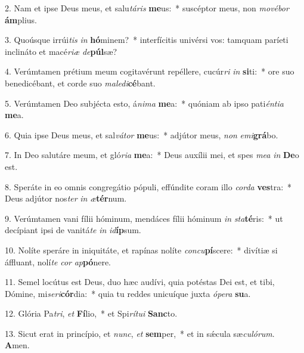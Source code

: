 2. Nam et ipse Deus meus, et salu\textit{tá}\textit{ris} \textbf{me}us:~*  suscéptor meus, non \textit{mo}\textit{vé}\textit{bor} \textbf{ám}plius.\

3. Quoúsque irrúi\textit{tis} \textit{in} \textbf{hó}minem?~*  interfícitis univérsi vos: tamquam paríeti inclináto et macé\textit{ri}\textit{æ} \textit{de}\textbf{púl}sæ?\

4. Verúmtamen prétium meum cogitavérunt repéllere, cucúr\textit{ri} \textit{in} \textbf{si}ti:~*  ore suo benedicébant, et corde suo \textit{ma}\textit{le}\textit{di}\textbf{cé}bant.\

5. Verúmtamen Deo subjécta esto, á\textit{ni}\textit{ma} \textbf{me}a:~*  quóniam ab ipso pati\textit{én}\textit{ti}\textit{a} \textbf{me}a.\

6. Quia ipse Deus meus, et sal\textit{vá}\textit{tor} \textbf{me}us:~*  adjútor meus, \textit{non} \textit{e}\textit{mi}\textbf{grá}bo.\

7. In Deo salutáre meum, et gló\textit{ri}\textit{a} \textbf{me}a:~*  Deus auxílii mei, et spes \textit{me}\textit{a} \textit{in} \textbf{De}o est.\

8. Speráte in eo omnis congregátio pópuli, effúndite coram illo \textit{cor}\textit{da} \textbf{ves}tra:~*  Deus adjútor nos\textit{ter} \textit{in} \textit{æ}\textbf{tér}num.\

9. Verúmtamen vani fílii hóminum, mendáces fílii hóminum \textit{in} \textit{sta}\textbf{té}ris:~*  ut decípiant ipsi de vanitá\textit{te} \textit{in} \textit{id}\textbf{íp}sum.\

10. Nolíte speráre in iniquitáte, et rapínas nolíte \textit{con}\textit{cu}\textbf{pí}scere:~*  divítiæ si áffluant, nolí\textit{te} \textit{cor} \textit{ap}\textbf{pó}nere.\

11. Semel locútus est Deus, duo hæc audívi, quia potéstas Dei est, et tibi, Dómine, mi\textit{se}\textit{ri}\textbf{cór}dia:~*  quia tu reddes unicuíque juxta \textit{ó}\textit{pe}\textit{ra} \textbf{su}a.\

12. Glória Pa\textit{tri}, \textit{et} \textbf{Fí}lio,~*  et Spi\textit{rí}\textit{tu}\textit{i} \textbf{Sanc}to.\

13. Sicut erat in princípio, et \textit{nunc}, \textit{et} \textbf{sem}per,~*  et in sǽcula sæ\textit{cu}\textit{ló}\textit{rum}. \textbf{A}men.\

